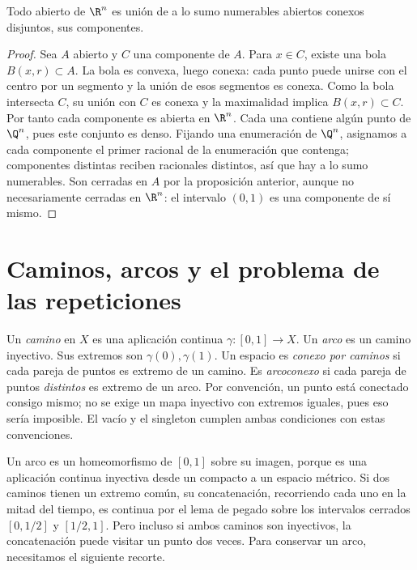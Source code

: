 \begin{proposicion}\label{ch18:abiertosEuclideos}
Todo abierto de $\R^n$ es unión de a lo sumo numerables abiertos conexos disjuntos, sus componentes.
\end{proposicion}
\begin{proof}
Sea $A$ abierto y $C$ una componente de $A$. Para $x\in C$, existe una bola $B(x,r)\subset A$. La bola es convexa, luego conexa: cada punto puede unirse con el centro por un segmento y la unión de esos segmentos es conexa. Como la bola intersecta $C$, su unión con $C$ es conexa y la maximalidad implica $B(x,r)\subset C$. Por tanto cada componente es abierta en $\R^n$. Cada una contiene algún punto de $\Q^n$, pues este conjunto es denso. Fijando una enumeración de $\Q^n$, asignamos a cada componente el primer racional de la enumeración que contenga; componentes distintas reciben racionales distintos, así que hay a lo sumo numerables. Son cerradas en $A$ por la proposición anterior, aunque no necesariamente cerradas en $\R^n$: el intervalo $(0,1)$ es una componente de sí mismo.
\end{proof}

\section{Caminos, arcos y el problema de las repeticiones}
\begin{definicion}
Un \emph{camino} en $X$ es una aplicación continua $\gamma:[0,1]\to X$. Un \emph{arco} es un camino inyectivo. Sus extremos son $\gamma(0),\gamma(1)$. Un espacio es \emph{conexo por caminos} si cada pareja de puntos es extremo de un camino. Es \emph{arcoconexo} si cada pareja de puntos \emph{distintos} es extremo de un arco. Por convención, un punto está conectado consigo mismo; no se exige un mapa inyectivo con extremos iguales, pues eso sería imposible. El vacío y el singleton cumplen ambas condiciones con estas convenciones.
\end{definicion}
Un arco es un homeomorfismo de $[0,1]$ sobre su imagen, porque es una aplicación continua inyectiva desde un compacto a un espacio métrico. Si dos caminos tienen un extremo común, su concatenación, recorriendo cada uno en la mitad del tiempo, es continua por el lema de pegado sobre los intervalos cerrados $[0,1/2]$ y $[1/2,1]$. Pero incluso si ambos caminos son inyectivos, la concatenación puede visitar un punto dos veces. Para conservar un arco, necesitamos el siguiente recorte.

